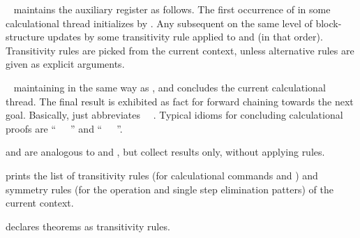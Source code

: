\begin{isabellebody}
\begin{isamarkuptext}
\begin{descr}
  \item [\mbox{\isa{\isacommand{also}}}~\isa{{\isachardoublequote}{\isacharparenleft}a\isactrlsub {\isadigit{1}}\ {\isasymdots}\ a\isactrlsub n{\isacharparenright}{\isachardoublequote}}]
  maintains the auxiliary \mbox{} register as follows.
  The first occurrence of \mbox{} in some calculational
  thread initializes \mbox{} by \mbox{}. Any
  subsequent \mbox{} on the same level of block-structure
  updates \mbox{} by some transitivity rule applied to
  \mbox{} and \mbox{} (in that order).  Transitivity
  rules are picked from the current context, unless alternative rules
  are given as explicit arguments.

  \item [\mbox{\isa{\isacommand{finally}}}~\isa{{\isachardoublequote}{\isacharparenleft}a\isactrlsub {\isadigit{1}}\ {\isasymdots}\ a\isactrlsub n{\isacharparenright}{\isachardoublequote}}]
  maintaining \mbox{} in the same way as \mbox{}, and concludes the current calculational thread.  The final
  result is exhibited as fact for forward chaining towards the next
  goal. Basically, \mbox{} just abbreviates \mbox{}~\mbox{}~\mbox{}.  Typical idioms for
  concluding calculational proofs are ``\mbox{}~\mbox{}~~\mbox{\isa{\isacommand{{\isachardot}}}}'' and ``\mbox{}~\mbox{}~\isa{{\isasymphi}}~\mbox{\isa{\isacommand{{\isachardot}}}}''.

  \item [\mbox{\isa{\isacommand{moreover}}} and \mbox{\isa{\isacommand{ultimately}}}] are
  analogous to \mbox{} and \mbox{}, but collect
  results only, without applying rules.

  \item [\mbox{\isa{\isacommand{print{\isacharunderscore}trans{\isacharunderscore}rules}}}] prints the list of
  transitivity rules (for calculational commands \mbox{} and
  \mbox{}) and symmetry rules (for the \mbox{} operation and single step elimination patters) of the
  current context.

  \item [\mbox{\isa{trans}}] declares theorems as transitivity rules.


\end{descr}
\end{isamarkuptext}
\end{isabellebody}
